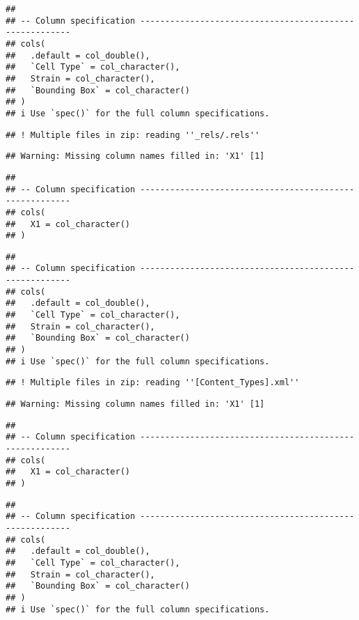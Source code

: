 \documentclass[
]{article}
\begin{document}
\begin{verbatim}
## 
## -- Column specification --------------------------------------------------------
## cols(
##   .default = col_double(),
##   `Cell Type` = col_character(),
##   Strain = col_character(),
##   `Bounding Box` = col_character()
## )
## i Use `spec()` for the full column specifications.
\end{verbatim}

\begin{verbatim}
## ! Multiple files in zip: reading ''_rels/.rels''
\end{verbatim}

\begin{verbatim}
## Warning: Missing column names filled in: 'X1' [1]
\end{verbatim}

\begin{verbatim}
## 
## -- Column specification --------------------------------------------------------
## cols(
##   X1 = col_character()
## )
\end{verbatim}

\begin{verbatim}
## 
## -- Column specification --------------------------------------------------------
## cols(
##   .default = col_double(),
##   `Cell Type` = col_character(),
##   Strain = col_character(),
##   `Bounding Box` = col_character()
## )
## i Use `spec()` for the full column specifications.
\end{verbatim}

\begin{verbatim}
## ! Multiple files in zip: reading ''[Content_Types].xml''
\end{verbatim}

\begin{verbatim}
## Warning: Missing column names filled in: 'X1' [1]
\end{verbatim}

\begin{verbatim}
## 
## -- Column specification --------------------------------------------------------
## cols(
##   X1 = col_character()
## )
\end{verbatim}

\begin{verbatim}
## 
## -- Column specification --------------------------------------------------------
## cols(
##   .default = col_double(),
##   `Cell Type` = col_character(),
##   Strain = col_character(),
##   `Bounding Box` = col_character()
## )
## i Use `spec()` for the full column specifications.
\end{verbatim}
\end{document}

